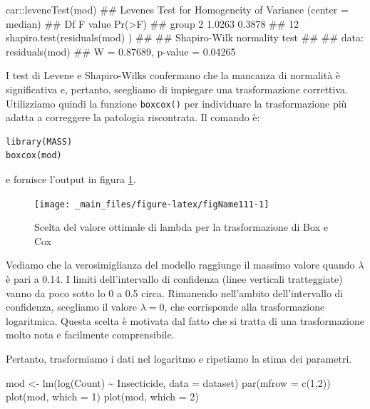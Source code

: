 \documentclass[a4paper,12pt,oneside]{book}
\newenvironment{Shaded}{\begin{snugshade}}{\end{snugshade}}
\newcommand{\DecValTok}[1]{#1}
\newcommand{\SpecialCharTok}[1]{#1}
\newcommand{\DocumentationTok}[1]{#1}
\newcommand{\OtherTok}[1]{#1}
\newcommand{\FunctionTok}[1]{#1}
\newcommand{\AttributeTok}[1]{#1}
\newcommand{\NormalTok}[1]{#1}
\begin{document}
\begin{Shaded}
\begin{Highlighting}[]
\NormalTok{car}\SpecialCharTok{::}\FunctionTok{leveneTest}\NormalTok{(mod)}
\DocumentationTok{\#\# Levene\textquotesingle{}s Test for Homogeneity of Variance (center = median)}
\DocumentationTok{\#\#       Df F value Pr(\textgreater{}F)}
\DocumentationTok{\#\# group  2  1.0263 0.3878}
\DocumentationTok{\#\#       12}
\FunctionTok{shapiro.test}\NormalTok{(}\FunctionTok{residuals}\NormalTok{(mod) )}
\DocumentationTok{\#\# }
\DocumentationTok{\#\#  Shapiro{-}Wilk normality test}
\DocumentationTok{\#\# }
\DocumentationTok{\#\# data:  residuals(mod)}
\DocumentationTok{\#\# W = 0.87689, p{-}value = 0.04265}
\end{Highlighting}
\end{Shaded}

I test di Levene e Shapiro-Wilks confermano che la mancanza di normalità è significativa e, pertanto, scegliamo di impiegare una trasformazione correttiva. Utilizziamo quindi la funzione \texttt{boxcox()} per individuare la trasformazione più adatta a correggere la patologia riscontrata. Il comando è:

\begin{verbatim}
library(MASS)
boxcox(mod)
\end{verbatim}

e fornisce l'output in figura \ref{fig:figName111}.

\begin{figure}

{\centering \texttt{[image: \_main\_files/figure-latex/figName111-1]} 

}

\caption{Scelta del valore ottimale di lambda per la trasformazione di Box e Cox}\label{fig:figName111}
\end{figure}

Vediamo che la verosimiglianza del modello raggiunge il massimo valore quando \(\lambda\) è pari a 0.14. I limiti dell'intervallo di confidenza (linee verticali tratteggiate) vanno da poco sotto lo 0 a 0.5 circa. Rimanendo nell'ambito dell'intervallo di confidenza, scegliamo il valore \(\lambda = 0\), che corrisponde alla trasformazione logaritmica. Questa scelta è motivata dal fatto che si tratta di una trasformazione molto nota e facilmente comprensibile.

Pertanto, trasformiamo i dati nel logaritmo e ripetiamo la stima dei parametri.

\begin{Shaded}
\begin{Highlighting}[]
\NormalTok{mod }\OtherTok{\textless{}{-}} \FunctionTok{lm}\NormalTok{(}\FunctionTok{log}\NormalTok{(Count) }\SpecialCharTok{\textasciitilde{}}\NormalTok{ Insecticide, }\AttributeTok{data =}\NormalTok{ dataset)}
\FunctionTok{par}\NormalTok{(}\AttributeTok{mfrow =} \FunctionTok{c}\NormalTok{(}\DecValTok{1}\NormalTok{,}\DecValTok{2}\NormalTok{))}
\FunctionTok{plot}\NormalTok{(mod, }\AttributeTok{which =} \DecValTok{1}\NormalTok{)}
\FunctionTok{plot}\NormalTok{(mod, }\AttributeTok{which =} \DecValTok{2}\NormalTok{)}
\end{Highlighting}
\end{Shaded}
\end{document}

